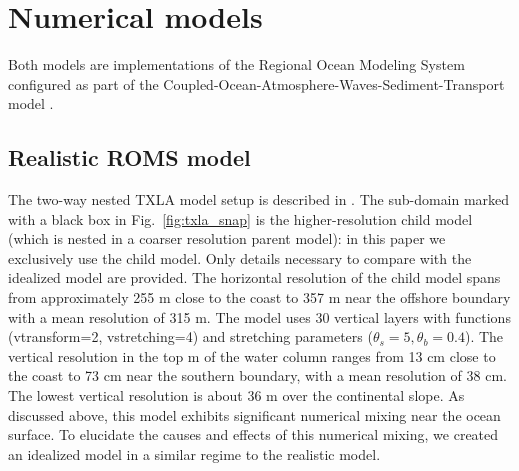 \section{Numerical models} \label{sec:model_setup}
Both models are implementations of the Regional Ocean Modeling System \citep[ROMS,][]{shchepetkin2005regional} configured as part of the Coupled-Ocean-Atmosphere-Waves-Sediment-Transport model \citep[COAWST, ver. 3.7,][]{Warner_2010}.

\subsection{Realistic ROMS model}
The two-way nested TXLA model setup is described in \citet{Schlichting23}. The sub-domain marked with a black box in Fig.~\ref{fig:txla_snap} is the higher-resolution child model (which is nested in a coarser resolution parent model): in this paper we exclusively use the child model. Only details necessary to compare with the idealized model are provided. The horizontal resolution of the child model spans from approximately 255 m close to the coast to 357 m near the offshore boundary with a mean resolution of 315 m. The model uses 30 vertical layers with functions (vtransform=2, vstretching=4) and stretching parameters ($\theta_s = 5,\theta_b=0.4$). The vertical resolution in the top m of the water column ranges from 13 cm close to the coast to 73 cm near the southern boundary, with a mean resolution of 38 cm. 
The lowest vertical resolution is about 36 m over the continental slope. As discussed above, this model exhibits significant numerical mixing near the ocean surface. To elucidate the causes and effects of this numerical mixing, we created an idealized model in a similar regime to the realistic model. 
 
